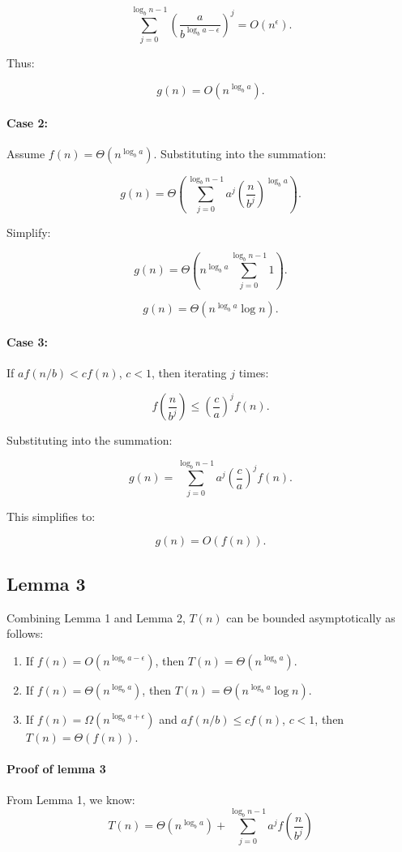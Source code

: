 \[
\sum_{j=0}^{\log_b n - 1} \left(\frac{a}{b^{\log_b a - \epsilon}}\right)^j = O(n^{\epsilon}).
\]

Thus:

\[
g(n) = O(n^{\log_b a}).
\]

\paragraph{Case 2:}
Assume \(f(n) = \Theta(n^{\log_b a})\). Substituting into the summation:

\[
g(n) = \Theta\left(\sum_{j=0}^{\log_b n - 1} a^j \left(\frac{n}{b^j}\right)^{\log_b a}\right).
\]

Simplify:

\[
g(n) = \Theta\left(n^{\log_b a} \sum_{j=0}^{\log_b n - 1} 1\right).
\]

\[
g(n) = \Theta(n^{\log_b a} \log n).
\]

\paragraph{Case 3:}
If \(af(n/b) < c f(n)\), \(c < 1\), then iterating \(j\) times:

\[
f\left(\frac{n}{b^j}\right) \leq \left(\frac{c}{a}\right)^j f(n).
\]

Substituting into the summation:

\[
g(n) = \sum_{j=0}^{\log_b n - 1} a^j \left(\frac{c}{a}\right)^j f(n).
\]

This simplifies to:

\[
g(n) = O(f(n)).
\]

\subsection{Lemma 3}

Combining Lemma 1 and Lemma 2, \(T(n)\) can be bounded asymptotically as follows:
\begin{enumerate}
    \item If \(f(n) = O(n^{\log_b a - \epsilon})\), then \(T(n) = \Theta(n^{\log_b a})\).
    \item If \(f(n) = \Theta(n^{\log_b a})\), then \(T(n) = \Theta(n^{\log_b a} \log n)\).
    \item If \(f(n) = \Omega(n^{\log_b a + \epsilon})\) and \(af(n/b) \leq cf(n)\), \(c < 1\), then \(T(n) = \Theta(f(n))\).
\end{enumerate}

\paragraph{Proof of lemma 3}
From Lemma 1, we know:
\[
T(n) = \Theta(n^{\log_b a}) + \sum_{j=0}^{\log_b n -1} a^j f\left(\frac{n}{b^j}\right)
\]

